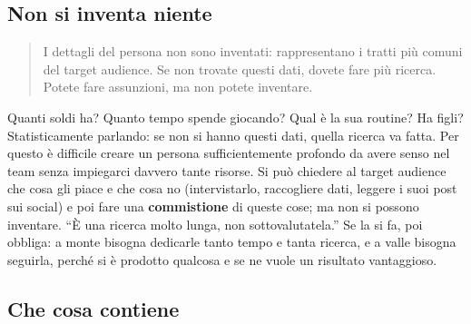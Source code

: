 \subsection{Non si inventa niente}

\begin{quote}
I dettagli del persona non sono inventati: rappresentano i tratti più comuni del
target audience. Se non trovate questi dati, dovete fare più ricerca. Potete fare
assunzioni, ma non potete inventare.
\end{quote}
Quanti soldi ha? Quanto tempo spende giocando? Qual è la sua routine? Ha figli?
Statisticamente parlando: se non si hanno questi dati, quella ricerca va fatta. Per
questo è difficile creare un persona sufficientemente profondo da avere senso nel
team senza impiegarci davvero tante risorse. Si può chiedere al target audience che
cosa gli piace e che cosa no (intervistarlo, raccogliere dati, leggere i suoi post sui
social) e poi fare una \textbf{commistione} di queste cose; ma non si possono
inventare. ``È una ricerca molto lunga, non sottovalutatela.'' Se la si fa, poi
obbliga: a monte bisogna dedicarle tanto tempo e tanta ricerca, e a valle bisogna
seguirla, perché si è prodotto qualcosa e se ne vuole un risultato vantaggioso.

\subsection{Che cosa contiene}

